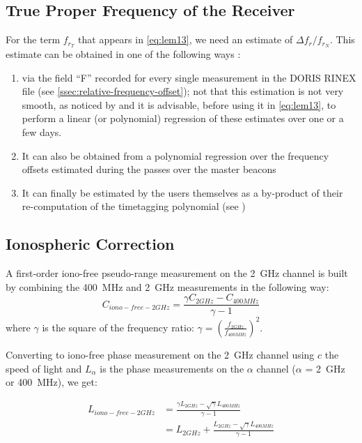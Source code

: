 \subsection{True Proper Frequency of the Receiver}
\label{ssec:true-proprtfrequency-of-the-receiver}

For the term \(f_{r_T}\) that appears in \ref{eq:lem13}, we need an estimate of \(\Delta f_{r} / f_{r_N}\). 
This estimate can be obtained in one of the following ways \cite{lemoine-2016}:
\begin{enumerate}
    \item via the field ``F'' recorded for every single measurement in the DORIS 
    RINEX file (see \ref{ssec:relative-frequency-offset}); not that this estimation 
    is not very smooth, as noticed by \cite{GAO2015} and it is advisable, before 
    using it in \ref{eq:lem13}, to perform a linear (or polynomial) regression of 
    these estimates over one or a few days.

    \item It can also be obtained from a polynomial regression
    over the frequency oﬀsets estimated during the passes
    over the master beacons

    \item It can ﬁnally be estimated by the users themselves as a
    by-product of their re-computation of the timetagging polynomial (see \cite{MERCIER2010})
\end{enumerate}

\subsection{Ionospheric Correction}
A ﬁrst-order iono-free pseudo-range measurement on the \SI{2}{\GHz} channel is built by combining
the \SI{400}{\MHz} and \SI{2}{\GHz} measurements in the following way:
\begin{equation}
  C_{iono-free-2GHz} = \frac{\gamma C_{2GHz} - C_{400MHz}}{\gamma - 1}
\end{equation}
where \(\gamma\) is the square of the frequency ratio: 
\(\gamma = {(\frac{f_{2GHz}}{f_{400MHz}})}^2\).

Converting to iono-free phase measurement on the \SI{2}{\GHz} channel using 
\(c\)  the speed of light and \(L_{\alpha}\) is the phase measurements on the 
\(\alpha\) channel (\(\alpha\) = \SI{2}{\GHz} or \SI{400}{\MHz}), we get:

\begin{equation}
  \begin{aligned}
  L_{iono-free-2GHz} &= \frac{\gamma L_{2GHz} - 
    \sqrt{\gamma}L_{400MHz}}{\gamma - 1} \\
                     &= L_{2GHz} + \frac{L_{2GHz} - 
                        \sqrt{\gamma}L_{400MHz}}{\gamma - 1}
  \end{aligned}
\end{equation}

